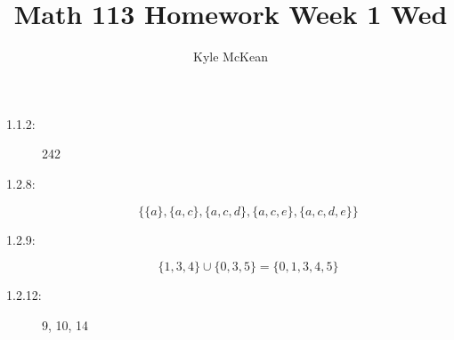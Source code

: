 \documentclass[11pt]{article}
\author{Kyle McKean}
\title{Math 113 Homework Week 1 Wed}
\begin{document}
\maketitle
\begin{description}
  \item[1.1.2:] 242
  \item[1.2.8:]
    \begin{equation}
      \{ \{ a \}, \{ a, c \}, \{ a, c, d \}, \{ a, c, e \}, \{ a, c, d, e \} \}
    \end{equation}
  \item[1.2.9:]
    \begin{equation}
      \{ 1, 3, 4 \} \cup \{ 0, 3, 5 \} = \{ 0, 1, 3, 4, 5 \}
    \end{equation}
  \item[1.2.12:] 9, 10, 14
\end{description} 
\end{document}
